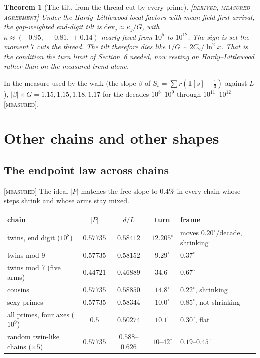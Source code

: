 \documentclass[11pt]{article}
\newtheorem{theorem}{Theorem}
\theoremstyle{definition}
\theoremstyle{remark}
\newcommand{\grade}[1]{\textsc{[#1]}}
\begin{document}
\begin{theorem}[The tilt, from the thread cut by every prime] \grade{derived, measured agreement}
Under the Hardy--Littlewood local factors with mean-field first arrival, the gap-weighted end-digit tilt is $\mathrm{dev}_j\approx\kappa_j/G$, with $\kappa\approx(-0.95,\ +0.81,\ +0.14)$ nearly fixed from $10^5$ to $10^{12}$. The sign is set the moment $7$ cuts the thread. The tilt therefore dies like $1/G\sim 2C_2/\ln^2x$. That is the condition the turn limit of Section~6 needed, now resting on Hardy--Littlewood rather than on the measured trend alone.
\end{theorem}

\noindent In the measure used by the walk (the slope $\beta$ of $S_s=\sum r(\mathbf 1[s]-\tfrac13)$ against $L$), $|\beta|\times G=1.15, 1.15, 1.18, 1.17$ for the decades $10^8$--$10^9$ through $10^{11}$--$10^{12}$ \grade{measured}.

\section{Other chains and other shapes}

\subsection{The endpoint law across chains} \grade{measured}
The ideal $|P|$ matches the free slope to $0.4\%$ in every chain whose steps shrink and whose arms stay mixed.

\begin{center}\small
\begin{tabular}{lcccl}
\toprule
chain & $|P|$ & $d/L$ & turn & frame\\
\midrule
twins, end digit ($10^8$) & $0.57735$ & $0.58412$ & $12.205^\circ$ & moves $0.20^\circ$/decade, shrinking\\
twins mod 9 & $0.57735$ & $0.58152$ & $9.29^\circ$ & $0.37^\circ$\\
twins mod 7 (five arms) & $0.44721$ & $0.46889$ & $34.6^\circ$ & $0.67^\circ$\\
cousins & $0.57735$ & $0.58850$ & $14.8^\circ$ & $0.22^\circ$, shrinking\\
sexy primes & $0.57735$ & $0.58344$ & $10.0^\circ$ & $0.85^\circ$, not shrinking\\
all primes, four axes ($10^9$) & $0.5$ & $0.50274$ & $10.1^\circ$ & $0.30^\circ$, flat\\
random twin-like chains ($\times5$) & $0.57735$ & $0.588$--$0.626$ & $10$--$42^\circ$ & $0.19$--$0.45^\circ$\\
\bottomrule
\end{tabular}
\end{center}
\end{document}
